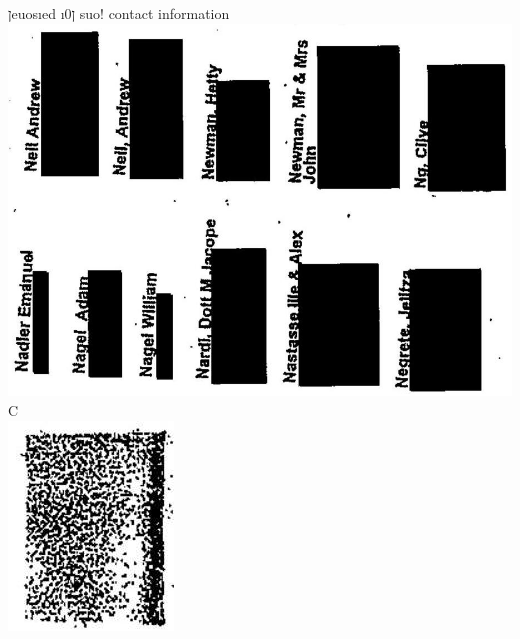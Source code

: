 \documentclass[10pt]{article}
\begin{document}
ןeuosıed ı0ן suo! contact information\\
\includegraphics[max width=\textwidth, center]{2025_02_27_dd68c3d38de88f0516d9g-162(1)}\\
C\\
\includegraphics[max width=\textwidth, center]{2025_02_27_dd68c3d38de88f0516d9g-162}\\
\end{document}
